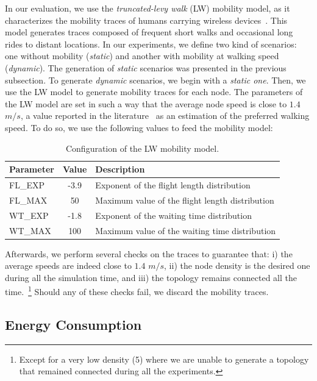 In our evaluation, we use the \textit{truncated-levy walk} (LW) mobility model, as it characterizes the mobility traces of humans carrying wireless devices~\cite{Rhee:2011}.
%
This model generates traces composed of frequent short walks and occasional long rides to distant locations.
%
In our experiments, we define two kind of scenarios: one without mobility (\textit{static}) and another with mobility at walking speed (\textit{dynamic}).
%
The generation of \textit{static} scenarios was presented in the previous subsection.
%
To generate \textit{dynamic} scenarios, we begin with a \textit{static one}.
%
Then, we use the LW model to generate mobility traces for each node.
%
The parameters of the LW model are set in such a way that the average node speed is close to $1.4$ $m/s$, a value reported in the literature~\cite{Browning390} as an estimation of the preferred walking speed.
%
To do so, we use the following values to feed the mobility model:

\begin{table}[ht]
	\footnotesize
	\centering
	
	\begin{tabular}{lcp{3.5cm}}
		\textbf{Parameter} & \textbf{Value} & \textbf{Description} \\
		
		\midrule
		FL\_EXP & -3.9 & Exponent of the flight length distribution \\
		FL\_MAX & 50 & Maximum value of the flight length distribution \\
		WT\_EXP & -1.8 & Exponent of the waiting time distribution \\
		WT\_MAX & 100 & Maximum value of the waiting time distribution \\
	\end{tabular}
	
	\caption{Configuration of the LW mobility model.}
	\label{tbl:mobility-parameters}
\end{table}

Afterwards, we perform several checks on the traces to guarantee that: i) the average speeds are indeed close to $1.4$ $m/s$, ii) the node density is the desired one during all the simulation time, and iii) the topology remains connected all the time.~\footnote{Except for a very low density (5) where we are unable to generate a topology that remained connected during all the experiments.}
%
Should any of these checks fail, we discard the mobility traces.

\subsection*{Energy Consumption}

